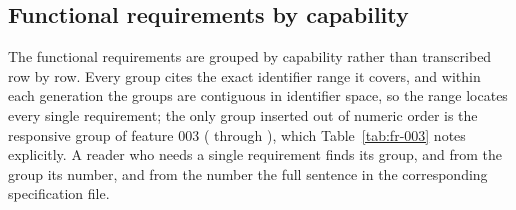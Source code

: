 \subsection{Functional requirements by capability}

The functional requirements are grouped by capability rather than transcribed row by row. Every
group cites the exact identifier range it covers, and within each generation the groups are
contiguous in identifier space, so the range locates every single requirement; the only group
inserted out of numeric order is the responsive group of feature 003 ( through
), which Table~\ref{tab:fr-003} notes explicitly. A reader who needs a single
requirement finds its group, and from the group its number, and from the number the full sentence
in the corresponding specification file.

